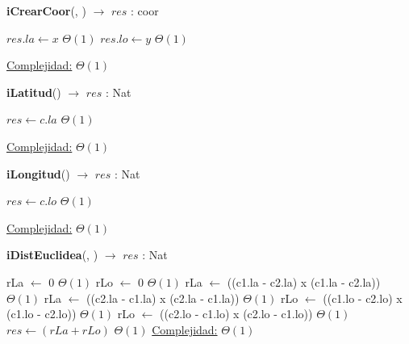 \begin{Algoritmos}

\medskip
	
  	\medskip
  
\begin{algorithm}[H]{\textbf{iCrearCoor}(, ) $\to$ $res$ : coor}
    	\begin{algorithmic}[1]
			\State $res.la \gets x$ \Comment $\Theta(1)$
			\State $res.lo \gets y$ \Comment $\Theta(1)$
			
			\medskip
			\Statex \underline{Complejidad:} $\Theta(1)$
    	\end{algorithmic}
\end{algorithm}

\begin{algorithm}[H]{\textbf{iLatitud}() $\to$ $res$ : Nat}
    	\begin{algorithmic}[1]
			\State $res \gets c.la$ \Comment $\Theta(1)$
			
			\medskip
			\Statex \underline{Complejidad:} $\Theta(1)$
    	\end{algorithmic}
\end{algorithm}

\begin{algorithm}[H]{\textbf{iLongitud}() $\to$ $res$ : Nat}
    	\begin{algorithmic}[1]
			\State $res \gets c.lo$ \Comment $\Theta(1)$
			
			\medskip
			\Statex \underline{Complejidad:} $\Theta(1)$
    	\end{algorithmic}
\end{algorithm}

\begin{algorithm}[H]{\textbf{iDistEuclidea}(, ) $\to$ $res$ : Nat}
    	\begin{algorithmic}[1]
			\State rLa $\gets$ 0	\Comment $\Theta(1)$
			\State rLo $\gets$ 0	\Comment $\Theta(1)$
				\State rLa $\gets$ ((c1.la - c2.la) x (c1.la - c2.la))	\Comment $\Theta(1)$
			\Else
				\State rLa $\gets$ ((c2.la - c1.la) x (c2.la - c1.la))	\Comment $\Theta(1)$
			\EndIf
				\State rLo $\gets$ ((c1.lo - c2.lo) x (c1.lo - c2.lo))	\Comment $\Theta(1)$
			\Else
				\State rLo $\gets$ ((c2.lo - c1.lo) x (c2.lo - c1.lo))	\Comment $\Theta(1)$
			\EndIf
			\State $res \gets (rLa + rLo)$	\Comment $\Theta(1)$
			\medskip
			\Statex \underline{Complejidad:} $\Theta(1)$
    	\end{algorithmic}
\end{algorithm}


\end{Algoritmos}
